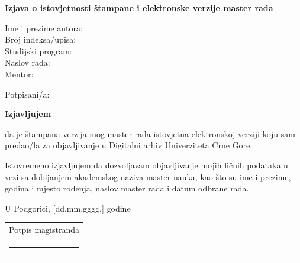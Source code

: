 \clearpage
\thispagestyle{empty}
\begingroup
\setlength{\parindent}{0pt}
\vspace*{1.5cm}
\begin{center}\bfseries Izjava o istovjetnosti štampane i elektronske verzije master rada\end{center}
\vspace{2em}

Ime i prezime autora: \RadAutor\\
Broj indeksa/upisa: \RadIndeks\\
Studijski program: \RadMasterStudije\\
Naslov rada: \RadNaslov\\
Mentor: \RadMentor

Potpisani/a: \textbf{\RadAutor}

\begin{center}\bfseries Izjavljujem\end{center}

da je štampana verzija mog master rada istovjetna elektronskoj verziji koju sam predao/la
za objavljivanje u Digitalni arhiv Univerziteta Crne Gore.

Istovremeno izjavljujem da dozvoljavam objavljivanje mojih ličnih podataka u vezi sa
dobijanjem akademskog naziva master nauka, kao što su ime i prezime, godina i mjesto rođenja,
naslov master rada i datum odbrane rada.

\vspace{3em}
U Podgorici, [dd.mm.gggg.] godine

\vspace{2em}
\hfill\begin{tabular}{c}
  Potpis magistranda\\[2.5em]
  \rule{5cm}{0.4pt}
\end{tabular}
\endgroup
